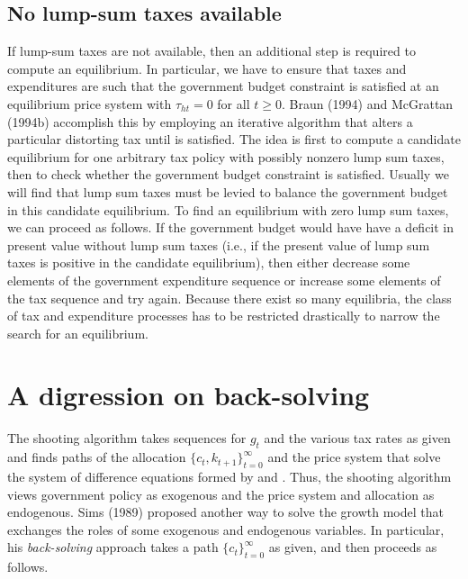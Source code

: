 \subsection{No lump-sum taxes available}
If lump-sum taxes are not available, then an additional step
is required to compute an equilibrium.  In particular,  we
have to ensure that taxes and expenditures are such that the
government budget constraint  is satisfied at an
equilibrium price system with $\tau_{ht} = 0 $ for all $t\geq 0$.
Braun (1994) and McGrattan (1994b) accomplish this by employing an
iterative algorithm that alters a particular distorting tax until
 is satisfied.  The idea is first to compute a candidate
equilibrium for one arbitrary tax policy with possibly nonzero lump sum taxes,  then to check whether
the government budget constraint is satisfied.  Usually we will find that lump sum taxes must be
levied to balance the government budget in this candidate equilibrium.  To find an equilibrium
with zero lump sum taxes, we can proceed as follows.  If the government
budget would have have a deficit   in present value without lump sum taxes (i.e., if the present value
of lump sum taxes is positive  in the candidate equilibrium), then either decrease some
elements of the government expenditure sequence or increase some
elements of the tax sequence and try again.  Because
there exist so many equilibria, the class of tax and expenditure
processes has to be restricted drastically  to narrow the search
for an equilibrium.




\section{A digression on back-solving}\label{sec:back-solving}%
The shooting algorithm takes sequences  for $g_t$  and the various
tax rates as  given and finds paths of the allocation $\{c_t,
k_{t+1}\}_{t=0}^\infty$ and the price system that solve the system
of difference equations formed by  and .
Thus, the shooting algorithm
views government policy as exogenous and the price system
and allocation as endogenous.   Sims (1989) proposed another
way to solve  the growth model that exchanges the roles of
some  exogenous and endogenous variables. In particular,
his
  {\it back-solving\/} approach  takes a path  $\{c_t\}_{t=0}^\infty$
  as given, and
then proceeds as follows. 

